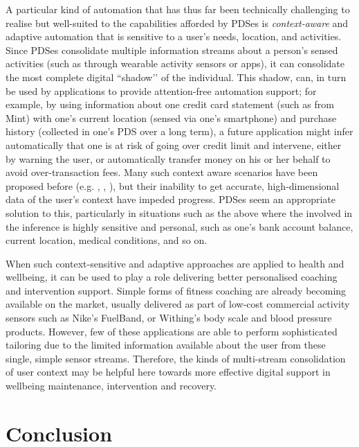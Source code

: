 \documentclass[graybox]{svmult}
\begin{document}
A particular kind of automation that has thus far been technically challenging to realise but well-suited to the capabilities afforded by PDSes is \emph{context-aware} and adaptive automation that is sensitive to a user’s needs, location, and activities.  Since PDSes consolidate multiple information streams about a person’s sensed activities (such as through wearable activity sensors or apps),  it can consolidate the most complete digital ``shadow’’ of the individual.  This shadow, can, in turn be used by applications to provide attention-free automation support; for example, by using information about one credit card statement (such as from Mint) with one’s current location (sensed via one’s smartphone) and purchase history (collected in one’s PDS over a long term), a future application might infer automatically that one is at risk of going over credit limit and intervene, either by warning the user, or automatically transfer money on his or her behalf to avoid over-transaction fees.  Many such context aware scenarios have been proposed before (e.g. \cite{selker2000context}, \cite{schilit1994context}, \cite{dey2001understanding}), but their inability to get accurate, high-dimensional data of the user’s context have impeded progress.  PDSes seem an appropriate solution to this, particularly in situations such as the above where the involved in the inference is highly sensitive and personal, such as one’s bank account balance, current location, medical conditions, and so on. 

When such context-sensitive and adaptive approaches are applied to health and wellbeing, it can be used to play a role delivering better personalised coaching and intervention support.  Simple forms of fitness coaching are already becoming available on the market, usually delivered as part of low-cost commercial activity sensors such as Nike’s FuelBand, or Withing’s body scale and blood pressure products. However, few of these applications are able to perform sophisticated tailoring due to the limited information available about the user from these single, simple sensor streams.  Therefore, the kinds of multi-stream consolidation of user context may be helpful here towards more effective digital support in wellbeing maintenance, intervention and recovery.

\section{Conclusion}
\end{document}
